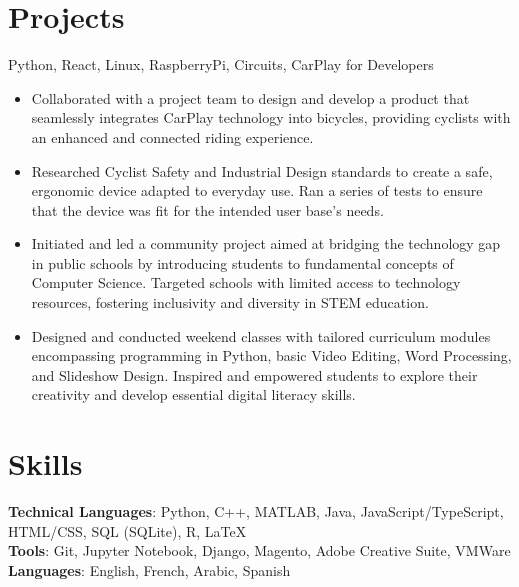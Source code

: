 \documentclass[letterpaper,10.5pt]{article}
\begin{document}
\section{Projects}
{Python, React, Linux, RaspberryPi, Circuits, CarPlay for Developers}{}
\begin{itemize}
    \item Collaborated with a project team to design and develop a product that seamlessly integrates CarPlay technology into bicycles, providing cyclists with an enhanced and connected riding experience.
    \item Researched Cyclist Safety and Industrial Design standards to create a safe, ergonomic device adapted to everyday use. Ran a series of tests to ensure that the device was fit for the intended user base's needs.
\end{itemize}

\begin{itemize}
    \item Initiated and led a community project aimed at bridging the technology gap in public schools by introducing students to fundamental concepts of Computer Science. Targeted schools with limited access to technology resources, fostering inclusivity and diversity in STEM education.
    
    \item Designed and conducted weekend classes with tailored curriculum modules encompassing programming in Python, basic Video Editing, Word Processing, and Slideshow Design. Inspired and empowered students to explore their creativity and develop essential digital literacy skills.
\end{itemize}
\section{Skills}
\textbf{Technical Languages}: Python, C++, MATLAB, Java, JavaScript/TypeScript, HTML/CSS,
SQL (SQLite), R, \LaTeX \\
\textbf{Tools}: Git, Jupyter Notebook, Django, Magento, Adobe Creative Suite, VMWare \\
\textbf{Languages}: English, French, Arabic, Spanish
\end{document}
